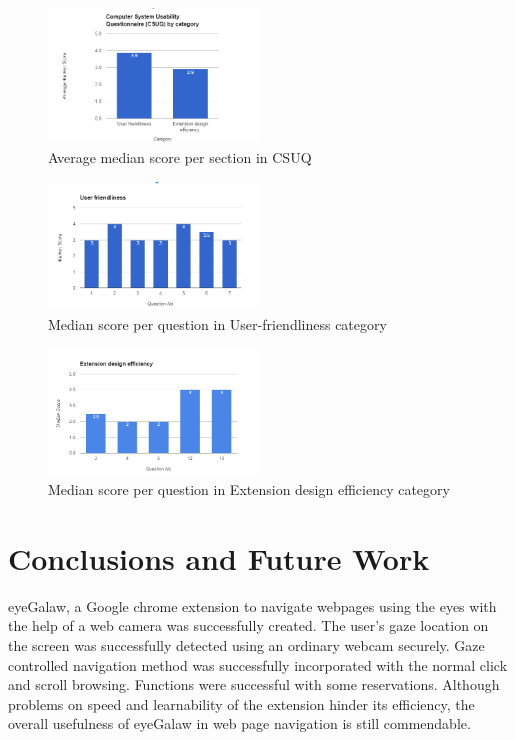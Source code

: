 \documentclass[journal]{./IEEE/IEEEtran}
\begin{document}
\begin{figure}[h!]
  \centering
    \includegraphics[width=0.5\textwidth]{./images/csuq.png}
  \caption{Average median score per section in CSUQ }
  \label{fig:16}
\end{figure}
\FloatBarrier
\begin{figure}[h!]
  \centering
    \includegraphics[width=0.5\textwidth]{./images/userfr.png}
  \caption{Median score per question in User-friendliness category }
  \label{fig:17}
\end{figure}
\FloatBarrier
\begin{figure}[h!]
  \centering
    \includegraphics[width=0.5\textwidth]{./images/effiiciency.png}
  \caption{Median score per question in Extension design efficiency category }
  \label{fig:18}
\end{figure}
\FloatBarrier



\section {Conclusions and Future Work}

eyeGalaw, a Google chrome extension to navigate webpages using the eyes with the help of a web camera was successfully created. The user’s gaze location on the screen was successfully detected using an ordinary webcam securely. Gaze controlled navigation method was successfully incorporated with the normal click and scroll browsing.  Functions were successful with some reservations.  Although problems on speed and learnability of the extension hinder its efficiency, the overall usefulness of eyeGalaw in web page navigation is still commendable. 
\end{document}

